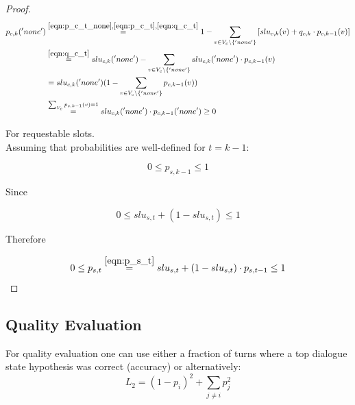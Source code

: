 \documentclass[12pt,titlepage,a4paper]{article}
\begin{document}
\begin{proof}
    \begin{equation}
        \begin{aligned}
            p_{c,k}('none') 
            &\overset{
                \mathrm{\ref{eqn:p_c_t_none}},
                \mathrm{\ref{eqn:p_c_t}}, 
                \mathrm{\ref{eqn:q_c_t}}
                }{=} 1 - \sum_{v \in V_{c} \backslash \{'none'\}} \left[ slu_{c,k}(v) + q_{c,k} \cdot p_{c,k-1}(v) \right] \\ 
            &\overset{
                \mathrm{\ref{eqn:q_c_t}}
                }{=} slu_{c,k}('none') - \sum_{v \in V_{c} \backslash \{'none'\}} slu_{c,k}('none') \cdot p_{c,k-1}(v) \\ 
            &= slu_{c,k}('none')(1 - \sum_{v \in V_{c} \backslash \{'none'\}}p_{c, k-1}(v)) 
            \\
            &\overset{\sum_{V_c}p_{c, k-1}(v) = 1}{=} slu_{c,k}('none') \cdot p_{c, k-1}('none') \geq 0
        \end{aligned}
    \end{equation}

    For requestable slots. \\
    
    Assuming that probabilities are well-defined for $t = k-1$:

    \begin{equation}
        0 \leq p_{s,k-1} \leq 1
    \end{equation}
    
    \noindent Since
    
    \begin{equation}
        0 \leq slu_{s,t} + (1 - slu_{s,t}) \leq 1
    \end{equation}

    \noindent Therefore

    \begin{equation}
        0 \leq p_{s,t} \overset{\ref{eqn:p_s_t}}{=} slu_{s,t} + (1 - slu_{s,t}) \cdot p_{s,t-1} \leq 1
    \end{equation}
\end{proof}

\subsection{Quality Evaluation}
For quality evaluation one can use either a fraction of turns where a top dialogue state hypothesis was correct (accuracy) or alternatively:
\begin{equation}
    L_2 = (1-p_i)^2 + \sum_{j \neq i} p_j^2
    \label{l2}
\end{equation}
\end{document}
